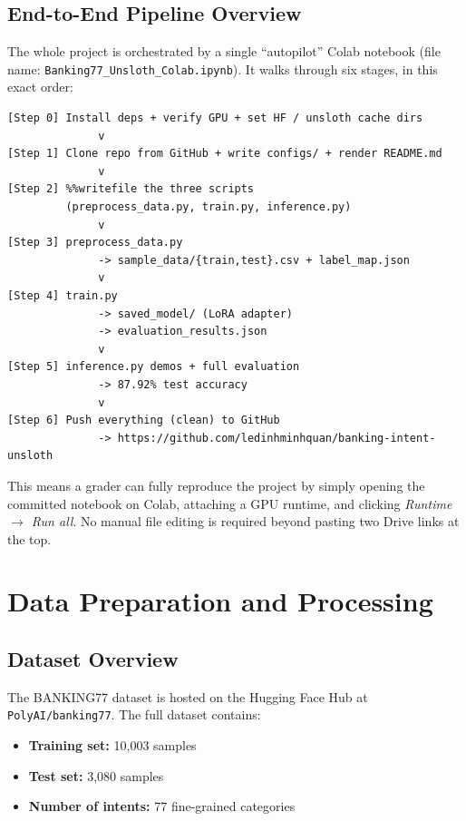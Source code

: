 \documentclass[12pt,a4paper]{article}
\begin{document}
\subsection{End-to-End Pipeline Overview}

The whole project is orchestrated by a single ``autopilot'' Colab notebook
(file name:
\texttt{Banking77\_\allowbreak Unsloth\_\allowbreak Colab.ipynb}).
It walks through six stages, in this exact order:

\begin{lstlisting}[language={},caption={High-level pipeline (notebook stages and what each one produces).}]
[Step 0] Install deps + verify GPU + set HF / unsloth cache dirs
              v
[Step 1] Clone repo from GitHub + write configs/ + render README.md
              v
[Step 2] %%writefile the three scripts
         (preprocess_data.py, train.py, inference.py)
              v
[Step 3] preprocess_data.py
              -> sample_data/{train,test}.csv + label_map.json
              v
[Step 4] train.py
              -> saved_model/ (LoRA adapter)
              -> evaluation_results.json
              v
[Step 5] inference.py demos + full evaluation
              -> 87.92% test accuracy
              v
[Step 6] Push everything (clean) to GitHub
              -> https://github.com/ledinhminhquan/banking-intent-unsloth
\end{lstlisting}

This means a grader can fully reproduce the project by simply opening the
committed notebook on Colab, attaching a GPU runtime, and clicking
\textit{Runtime $\rightarrow$ Run all}. No manual file editing is required
beyond pasting two Drive links at the top.

\section{Data Preparation and Processing}
\label{sec:data}

\subsection{Dataset Overview}

The BANKING77 dataset is hosted on the Hugging Face Hub at
\texttt{PolyAI/banking77}. The full dataset contains:
\begin{itemize}[noitemsep]
    \item \textbf{Training set:} 10{,}003 samples
    \item \textbf{Test set:} 3{,}080 samples
    \item \textbf{Number of intents:} 77 fine-grained categories
\end{itemize}
\end{document}
